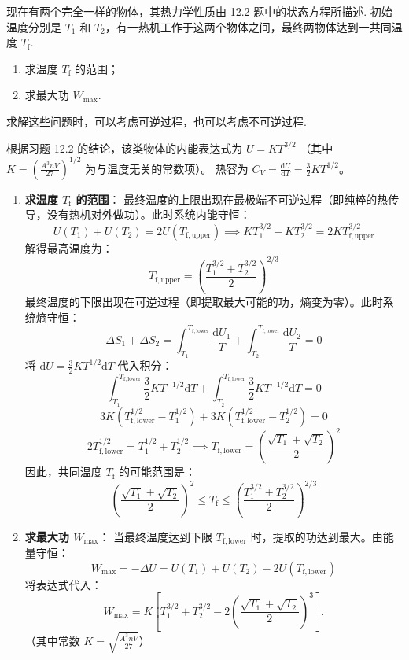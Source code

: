 \begin{exercise}\label{ex:12.6}
现在有两个完全一样的物体，其热力学性质由 12.2 题中的状态方程所描述. 初始温度分别是 $T_1$ 和 $T_2$，有一热机工作于这两个物体之间，最终两物体达到一共同温度 $T_{\mathrm{f}}$. 
\begin{enumerate}
  \item[(a)] 求温度 $T_{\mathrm{f}}$ 的范围；
  \item[(b)] 求最大功 $W_{\max}$.
\end{enumerate}
求解这些问题时，可以考虑可逆过程，也可以考虑不可逆过程.
\end{exercise}
\begin{solution}
根据习题 12.2 的结论，该类物体的内能表达式为 $U = K T^{3/2}$ （其中 $K = \left( \frac{A^3 n V}{27} \right)^{1/2}$ 为与温度无关的常数项）。
热容为 $C_V = \frac{\mathrm{d}U}{\mathrm{d}T} = \frac{3}{2} K T^{1/2}$。

\begin{enumerate}
    \item[(a)] \textbf{求温度 $T_{\mathrm{f}}$ 的范围}：
    最终温度的上限出现在最极端不可逆过程（即纯粹的热传导，没有热机对外做功）。此时系统内能守恒：
    $$ U(T_1) + U(T_2) = 2 U(T_{\mathrm{f, upper}}) \implies K T_1^{3/2} + K T_2^{3/2} = 2 K T_{\mathrm{f, upper}}^{3/2} $$
    解得最高温度为：
    $$ T_{\mathrm{f, upper}} = \left( \frac{T_1^{3/2} + T_2^{3/2}}{2} \right)^{2/3} $$
    最终温度的下限出现在可逆过程（即提取最大可能的功，熵变为零）。此时系统熵守恒：
    $$ \Delta S_1 + \Delta S_2 = \int_{T_1}^{T_{\mathrm{f, lower}}} \frac{\mathrm{d}U_1}{T} + \int_{T_2}^{T_{\mathrm{f, lower}}} \frac{\mathrm{d}U_2}{T} = 0 $$
    将 $\mathrm{d}U = \frac{3}{2} K T^{1/2} \mathrm{d}T$ 代入积分：
    $$ \int_{T_1}^{T_{\mathrm{f, lower}}} \frac{3}{2} K T^{-1/2} \mathrm{d}T + \int_{T_2}^{T_{\mathrm{f, lower}}} \frac{3}{2} K T^{-1/2} \mathrm{d}T = 0 $$
    $$ 3K \left( T_{\mathrm{f, lower}}^{1/2} - T_1^{1/2} \right) + 3K \left( T_{\mathrm{f, lower}}^{1/2} - T_2^{1/2} \right) = 0 $$
    $$ 2 T_{\mathrm{f, lower}}^{1/2} = T_1^{1/2} + T_2^{1/2} \implies T_{\mathrm{f, lower}} = \left( \frac{\sqrt{T_1} + \sqrt{T_2}}{2} \right)^2 $$
    因此，共同温度 $T_{\mathrm{f}}$ 的可能范围是：
    $$ \left( \frac{\sqrt{T_1} + \sqrt{T_2}}{2} \right)^2 \le T_{\mathrm{f}} \le \left( \frac{T_1^{3/2} + T_2^{3/2}}{2} \right)^{2/3} $$

    \item[(b)] \textbf{求最大功 $W_{\max}$}：
    当最终温度达到下限 $T_{\mathrm{f, lower}}$ 时，提取的功达到最大。由能量守恒：
    $$ W_{\max} = -\Delta U = U(T_1) + U(T_2) - 2 U(T_{\mathrm{f, lower}}) $$
    将表达式代入：
    \[
    W_{\max}=K\left[
      T_1^{3/2}+T_2^{3/2}
      -2\left(\frac{\sqrt{T_1}+\sqrt{T_2}}{2}\right)^3
    \right].
    \]
    （其中常数 $K = \sqrt{\frac{A^3 n V}{27}}$）
\end{enumerate}
\end{solution}


